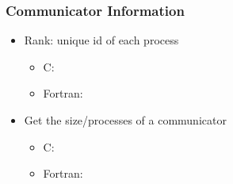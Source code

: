 \documentclass[10pt,t]{beamer}
\begin{document}
\begin{frame}[fragile]
  \frametitle{Communicator Information}
  \begin{itemize}
  \item Rank: unique id of each process
    \begin{itemize}
    \item \textcolor{lubrown}{C:} 
    \item \textcolor{lubrown}{Fortran:} 
    \end{itemize}
  \item Get the size/processes of a communicator
    \begin{itemize}
    \item \textcolor{lubrown}{C:} 
    \item \textcolor{lubrown}{Fortran:} 
    \end{itemize}
  \end{itemize}
\end{frame}
\end{document}
